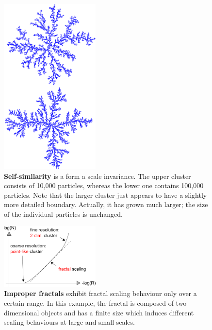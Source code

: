 \documentclass[twocolumn,10pt]{scrartcl}
\begin{document}
        \begin{figure}
            \center
            \includegraphics[width=5cm]{img/selfsim.png}
            \caption[Self-similarity]
                {\small\textbf{Self-similarity} is a form a scale invariance. The upper cluster consists of 10,000
                particles, whereas the lower one contains 100,000 particles. Note that the larger cluster just appears
                to have a slightly more detailed boundary. Actually, it has grown much larger; the size of the
                individual particles is unchanged.}
            \label{fig-selfsim}
        \end{figure}

        \begin{figure}
            \center
            \includegraphics[width=5cm]{img/scale.png}
            \caption[Improper Fractals]
                {\small\textbf{Improper fractals} exhibit fractal scaling behaviour only over a certain range.
                In this example, the fractal is composed of two-dimensional objects and has a finite size
                which induces different scaling behaviours at large and small scales.}
            \label{fig-scale}
        \end{figure}
\end{document}
